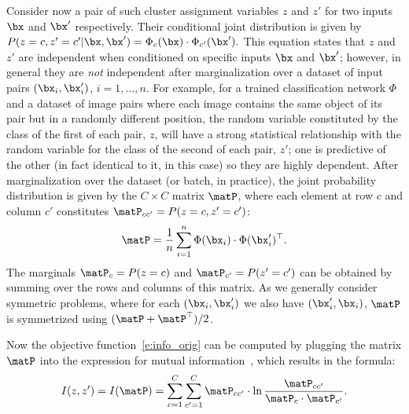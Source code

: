 Consider now a pair of such cluster assignment variables $z$ and $z'$ for two inputs $\bx$ and $\bx'$ respectively.
Their conditional joint distribution is given by
$
P(z=c,z'=c'|\bx,\bx')
=  \bPhi_c(\bx) \cdot \bPhi_{c'}(\bx').
$
This equation states that $z$ and $z'$ are independent
when conditioned on specific inputs $\bx$ and $\bx'$; however, in general they are \emph{not} independent after marginalization over a dataset of input pairs $(\bx_i,\bx'_i)$, $i=1,\dots,n$.
For example, for a trained classification network $\Phi$ and a dataset of image pairs where each image contains the same object of its pair but in a randomly different position, the random variable constituted by the class of the first of each pair, $z$, will have a strong statistical relationship with the random variable for the class of the second of each pair, $z'$; one is predictive of the other (in fact identical to it, in this case) so they are highly dependent. 
After marginalization over the dataset (or batch, in practice), the joint probability distribution is given by the $C\times C$ matrix $\matP$, where each element at row $c$ and column $c'$ constitutes $\matP_{cc'} = P(z=c,z'=c')$:
\begin{equation}\label{e:joint}
\matP
=
\frac{1}{n} 
\sum_{i=1}^n \bPhi(\bx_i) \cdot\bPhi(\bx'_i)^\top.
\end{equation}
The marginals $\matP_c=P(z=c)$ and $\matP_{c'}=P(z'=c')$ can be obtained by summing over the rows and columns of this matrix. 
As we generally consider symmetric problems, where for each $(\bx_i,\bx'_i)$ we also have $(\bx'_i,\bx_i)$, $\matP$ is symmetrized using $(\matP+\matP^\top)/2$.

Now the objective function~\cref{e:info_orig} can be computed by plugging the matrix $\matP$ into the expression for mutual information~\cite{learned2013entropy}, which results in the formula:
\begin{equation}\label{e:loss_expanded}
I(z,z') =
I(\matP) =
\sum_{c=1}^C
\sum_{c'=1}^C
\matP_{cc'} \cdot 
\ln\frac{\matP_{cc'}}{\matP_c \cdot \matP_{c'}}.
\end{equation}

